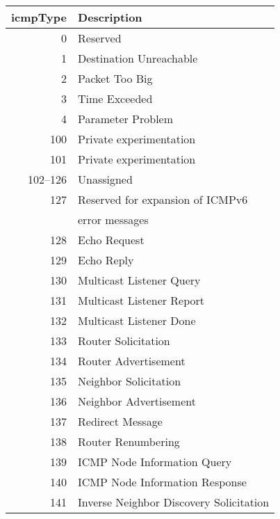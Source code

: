 \documentclass[documentation]{subfiles}
\begin{document}
\begin{small}
    \begin{minipage}{.48\textwidth}
        \begin{longtable}{rl}
            \toprule
            {\bf icmpType} & {\bf Description}\\
            \midrule\endhead%
            0   & Reserved\\
            1   & Destination Unreachable\\
            2   & Packet Too Big\\
            3   & Time Exceeded\\
            4   & Parameter Problem\\
            100 & Private experimentation\\
            101 & Private experimentation\\
            102--126 & Unassigned\\
            127 & Reserved for expansion of ICMPv6\\
                & error messages\\
            128 & Echo Request\\
            129 & Echo Reply\\
            130 & Multicast Listener Query\\
            131 & Multicast Listener Report\\
            132 & Multicast Listener Done\\
            133 & Router Solicitation\\
            134 & Router Advertisement\\
            135 & Neighbor Solicitation\\
            136 & Neighbor Advertisement\\
            137 & Redirect Message\\
            138 & Router Renumbering\\
            139 & ICMP Node Information Query\\
            140 & ICMP Node Information Response\\
            141 & Inverse Neighbor Discovery Solicitation \\
            \bottomrule
        \end{longtable}
    \end{minipage}
    \hfill
    \begin{minipage}{.48\textwidth}
        \begin{longtable}{rl}
            \toprule

\end{longtable}
\end{minipage}
\end{small}
\end{document}
